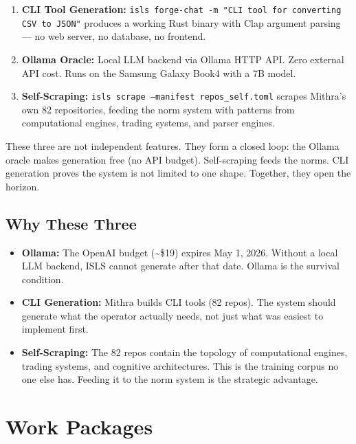 \documentclass[11pt,a4paper]{article}
\begin{document}
\begin{enumerate}[nosep]
\item \textbf{CLI Tool Generation:} \texttt{isls forge-chat -m 
      "CLI tool for converting CSV to JSON"} produces a working 
      Rust binary with Clap argument parsing --- no web server, no 
      database, no frontend.
\item \textbf{Ollama Oracle:} Local LLM backend via Ollama HTTP API.
      Zero external API cost. Runs on the Samsung Galaxy Book4 
      with a 7B model.
\item \textbf{Self-Scraping:} \texttt{isls scrape --manifest 
      repos\_self.toml} scrapes Mithra's own 82 repositories, 
      feeding the norm system with patterns from computational 
      engines, trading systems, and parser engines.
\end{enumerate}

These three are not independent features. They form a closed loop: 
the Ollama oracle makes generation free (no API budget). Self-scraping 
feeds the norms. CLI generation proves the system is not limited to 
one shape. Together, they open the horizon.

\subsection{Why These Three}

\begin{itemize}[nosep]
\item \textbf{Ollama:} The OpenAI budget (\textasciitilde\$19) expires 
      May 1, 2026. Without a local LLM backend, ISLS cannot generate 
      after that date. Ollama is the survival condition.
\item \textbf{CLI Generation:} Mithra builds CLI tools (82 repos). 
      The system should generate what the operator actually needs, 
      not just what was easiest to implement first.
\item \textbf{Self-Scraping:} The 82 repos contain the topology of 
      computational engines, trading systems, and cognitive 
      architectures. This is the training corpus no one else has. 
      Feeding it to the norm system is the strategic advantage.
\end{itemize}


\section{Work Packages}
\end{document}
